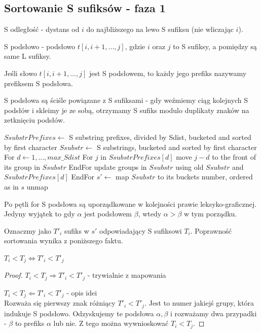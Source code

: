 \subsection{Sortowanie S sufiksów - faza 1}

\begin{definition}{}{}
S odległość - dystans od $i$ do najbliższego na lewo S sufiksu (nie wliczając $i$).
\end{definition}

\begin{definition}{}{}
S podsłowo - podsłowo $t[i,i+1,...,j]$, gdzie $i$ oraz $j$ to S sufiksy, a pomiędzy są same L sufiksy.
\end{definition}

\begin{definition}{}{}
Jeśli słowo $t[i,i+1,...,j]$ jest S podsłowem, to każdy jego prefiks nazywamy prefiksem S podsłowa.
\end{definition}

S podsłowa są ściśle powiązane z S sufiksami - gdy weźmiemy ciąg kolejnych S podsłów i skleimy je ze sobą, otrzymamy S sufiks modulo duplikaty znaków na zetknięciu podsłów.


\begin{algorithmic}
\State $SsubstrPrefixes \gets$ S substring prefixes, divided by Sdist, bucketed and sorted by first character
\State $Ssubstr \gets$ S substrings, bucketed and sorted by first character
\State For $d \gets 1,...,max\_Sdist$
\State For $j$ in $SsubstrPrefixes[d]$
\State move $j-d$ to the front of its group in $Ssubstr$
\State EndFor
\State update groups in $Ssubstr$ using old $Ssubstr$ and $SsubstrPrefixes[d]$ 
\State EndFor
\State $s' \gets$ map $Ssubstr$ to its buckets number, ordered as in $s$
\State \Return unmap 
\EndProcedure
\end{algorithmic}

Po pętli for S podsłowa są uporządkowane w kolejności prawie leksyko-graficznej. Jedyny wyjątek to gdy $\alpha$ jest podsłowem $\beta$, wtedy $\alpha > \beta$ w tym porządku.

Oznaczmy jako $T'_i$ sufiks w $s'$ odpowiadający S sufiksowi $T_i$. Poprawność sortowania wynika z poniższego faktu.

\begin{lemma}{}{}
$T_i < T_j \iff T'_i < T'_j$
\end{lemma}
\begin{proof}
\item[$T_i < T_j \Rightarrow T'_i < T'_j$] - trywialnie z mapowania
\item[$T_i < T_j \Leftarrow T'_i < T'_j$] - opis idei\\
Rozważa się pierwszy znak różniący $T'_i < T'_j$. Jest to numer jakiejś grupy, która indukuje S podsłowo. Odzyskujemy te podsłowa $\alpha,\beta$ i rozważamy dwa przypadki - $\beta$ to prefiks $\alpha$ lub nie. Z tego można wywnioskować $T_i < T_j$.
\end{proof}


